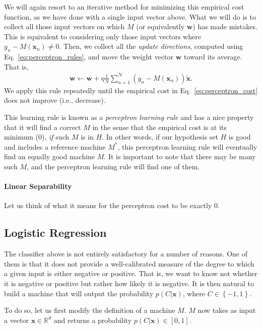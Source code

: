\documentclass{report}
\newcommand{\vect}[1]{\mathbf{#1}}
\newcommand{\vx}[0]{\vect{x}}
\newcommand{\vw}[0]{\vect{w}}
\newcommand{\todo}[1]{{\Large\textcolor{red}{#1}}}
\begin{document}
We will again resort to an iterative method for minimizing this empirical cost
function, as we have done with a single input vector above. What we will do is
to collect all those input vectors on which $M$ (or equivalently $\vw$) has made
mistakes. This is equivalent to considering only those input vectors where
$y_n-M(\vx_n) \neq 0$. Then, we collect all the {\it update directions},
computed using Eq.~\eqref{eq:perceptron_rules}, and move the weight vector
$\vw$ toward its average. That is,
\begin{align}
    \label{eq:perceptron_rule1}
    \vw \leftarrow \vw + \eta \frac{1}{N} \sum_{n=1}^N \left( y_n - M(\vx_n)\right) \tilde{\vx}.
\end{align}
We apply this rule repeatedly until the empirical cost in
Eq.~\eqref{eq:perceptron_cost} does not improve (i.e., decrease). 

This learning rule is known as a {\it perceptron learning rule} and has a nice
property that it will find a correct $M$ in the sense that the empirical cost is
at its minimum (0), {\it if} such $M$ is in $H$. In other words, if our
hypothesis set $H$ is good and includes a reference machine $M^*$, this
perceptron learning rule will eventually find an equally good machine $M$. It is
important to note that there may be many such $M$, and the perceptron learning
rule will find one of them. 

\paragraph{Linear Separability}

Let us think of what it means for the perceptron cost to be exactly $0$. 



\todo{}


\subsection{Logistic Regression}

The classifier above is not entirely satisfactory for a number of reasons. One
of them is that it does not provide a well-calibrated measure of the degree to
which a given input is either negative or positive. That is, we want to know not
whether it is negative or positive but rather how likely it is negative. It is
then natural to build a machine that will output the probability $p(C|\vx)$,
where $C \in \left\{ -1, 1\right\}$.

To do so, let us first modify the definition of a machine $M$. $M$ now takes as
input a vector $\vx \in \mathbb{R}^d$ and returns a probability $p(C|\vx) \in
\left[ 0, 1\right]$.
\end{document}
